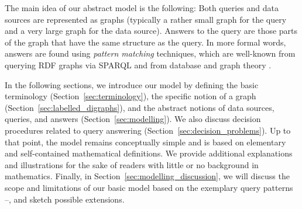 The main idea of our abstract model is the following:
Both queries and data sources are represented as graphs
(typically a rather small graph for the query and a very large graph for the data source).
Answers to the query are those parts of the graph that have the same structure
as the query. In more formal words, answers are found using \emph{pattern matching} techniques,
which are well-known from querying \gls{RDF} graphs via \gls{SPARQL} \autocite{DellaValle2011}
and from database and graph theory \autocite{Abiteboul1995,Diestel2012}.

%
%

In the following sections, we introduce our model
by defining 
the basic terminology (Section~\ref{sec:terminology}),
the specific notion of a graph (Section~\ref{sec:labelled_digraphs}),
and the abstract notions of data sources, queries, and answers
(Section~\ref{sec:modelling}).
We also discuss decision procedures related to query answering (Section~\ref{sec:decision_problems}).
Up to that point, the model remains conceptually simple
and is based on elementary and self-contained mathematical definitions.
We provide additional explanations and illustrations
for the sake of readers with little or no background in mathematics.
%
Finally, in Section~\ref{sec:modelling_discussion}, we will discuss
the scope and limitations of our basic model based on the exemplary query patterns
--, and sketch possible extensions.

